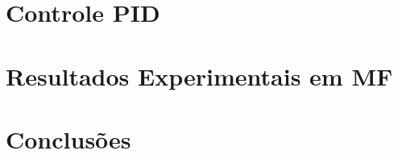 \documentclass[journal]{IEEEtran}
\begin{document}
\section{Controle PID}\label{Sec:ControlePID}
	

\section{Resultados Experimentais em MF}\label{Sec:ResultadosMF}
	
	
\section{Conclusões}\label{Sec:ConsiderFinais}
	



\end{document}
